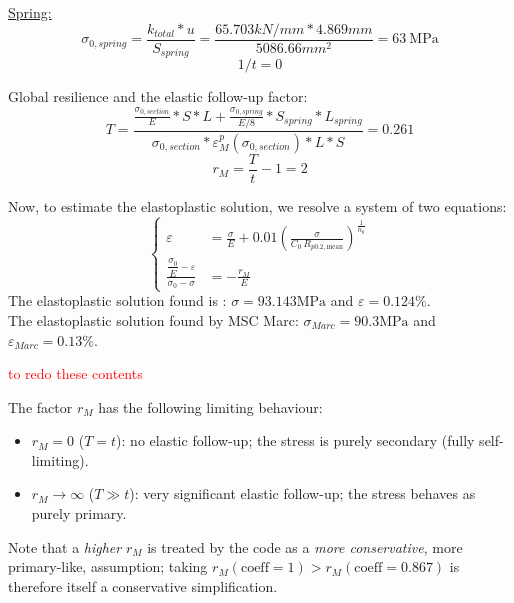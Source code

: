\documentclass[10pt,a4paper]{article}
\begin{document}
\underline{Spring:} \\
\begin{equation*}
\sigma_{0,spring} = \frac{k_{total}*u}{S_{spring}} = \frac{65.703 kN/mm * 4.869mm}{5086.66 mm^2}=63~\mathrm{MPa}
\end{equation*}
\begin{equation*}
1/t = 0
\end{equation*}


Global resilience and the elastic follow-up factor:
\begin{equation*}
T=\frac{\frac{\sigma_{0,section}}{E}*S*L+\frac{\sigma_{0,spring}}{E/8}*S_{spring}*L_{spring}}{\sigma_{0,section}*\varepsilon_M^p(\sigma_{0,section})*L*S}=0.261
\end{equation*}
\begin{equation*}
r_M=\frac{T}{t}-1=2
\end{equation*}


Now, to estimate the elastoplastic solution, we resolve a system of two equations:
\begin{equation*} 
\left\{ \begin{aligned} 
\varepsilon &= \frac{\sigma}{E} + 0.01 \left( \frac{\sigma}{C_0\,R_{p0.2,\mathrm{mean}}} \right)^{\frac{1}{n_0}} \\[1em]
\frac{\dfrac{\sigma_0}{E}-\varepsilon} {\sigma_0-\sigma} &= -\frac{r_M}{E} 
\end{aligned} \right.
\end{equation*}
The elastoplastic solution found is :  $\sigma=93.143\mathrm{MPa}$ and $\varepsilon=0.124 \%$. \\
The elastoplastic solution found by MSC Marc: $\sigma_{Marc}=90.3\mathrm{MPa}$ and $\varepsilon_{Marc}=0.13 \%$.





\newpage
\textcolor{red}{to redo these contents}


The factor $r_M$ has the following limiting behaviour:
\begin{itemize}
    \item $r_M = 0$ ($T=t$): no elastic follow-up; the stress is purely secondary (fully self-limiting).
    \item $r_M \to \infty$ ($T \gg t$): very significant elastic follow-up; the stress behaves as purely primary.
\end{itemize}
Note that a \emph{higher} $r_M$ is treated by the code as a \emph{more conservative}, more primary-like, assumption; taking $r_M(\mathrm{coeff}=1) > r_M(\mathrm{coeff}=0.867)$ is therefore itself a conservative simplification.
\end{document}
